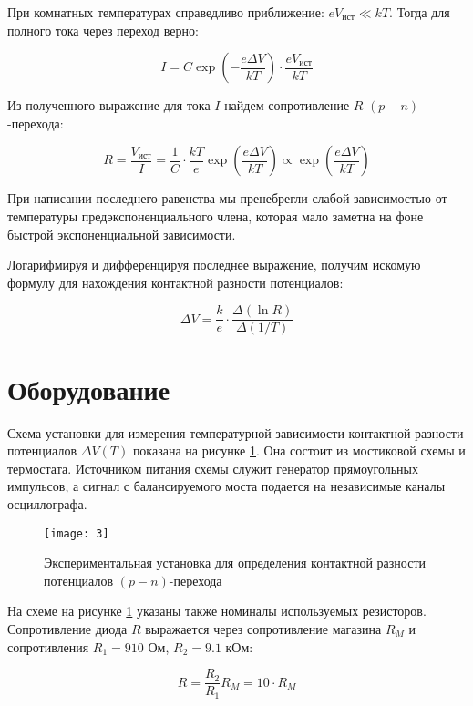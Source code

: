 \documentclass[a4paper, 12pt]{article}
\begin{document}
	При комнатных температурах справедливо приближение: $eV_\text{ист} \ll kT$. Тогда для полного тока через переход верно: 
	
	\[ I = C\exp{\left(-\frac{e\Delta V}{kT}\right)} \cdot \frac{eV_\text{ист}}{kT} \]
	
	Из полученного выражение для тока $I$ найдем сопротивление $R$ $(p-n)$-перехода: 
	
	\[ R = \frac{V_\text{ист}}{I} = \frac{1}{C} \cdot \frac{kT}{e} \exp{\left(\frac{e\Delta V}{kT}\right)} \propto \exp{\left(\frac{e\Delta V}{kT}\right)}\]
	
	При написании последнего равенства мы пренебрегли слабой зависимостью от температуры предэкспоненциального члена, которая
	мало заметна на фоне быстрой экспоненциальной зависимости.
	
	Логарифмируя и дифференцируя последнее выражение, получим искомую формулу для нахождения контактной разности потенциалов:
	
	\begin{equation}\label{dV}
	\Delta V = \frac{k}{e}\cdot \frac{\Delta(\ln R)}{\Delta(1/T)}
	\end{equation}







\section{Оборудование}


	Схема установки для измерения температурной зависимости контактной разности потенциалов $\Delta V(T)$ показана на рисунке \ref{pic:scheme}. Она состоит из мостиковой схемы и термостата. Источником питания схемы служит генератор прямоугольных импульсов, а сигнал с балансируемого моста подается на независимые каналы осциллографа.

		\begin{figure}[h]
		\centering
		\texttt{[image: 3]}
		\caption{Экспериментальная установка для определения контактной разности потенциалов $(p-n)$-перехода}
		\label{pic:scheme}
	\end{figure}


	На схеме на рисунке \ref{pic:scheme} указаны также номиналы используемых резисторов. Сопротивление диода $R$ выражается через сопротивление магазина $R_M$ и сопротивления $R_1 = 910$ Ом, $R_2 = 9.1$ кОм:

	\[ R = \frac{R_2}{R_1}R_M = 10\cdot R_M \]
\end{document}
